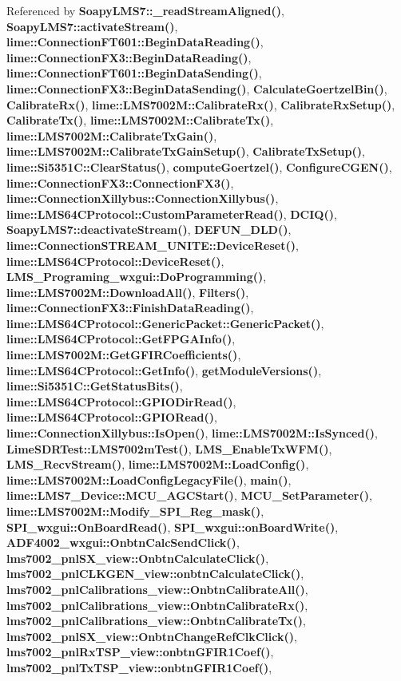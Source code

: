 Referenced by {\bf Soapy\+L\+M\+S7\+::\+\_\+read\+Stream\+Aligned()}, {\bf Soapy\+L\+M\+S7\+::activate\+Stream()}, {\bf lime\+::\+Connection\+F\+T601\+::\+Begin\+Data\+Reading()}, {\bf lime\+::\+Connection\+F\+X3\+::\+Begin\+Data\+Reading()}, {\bf lime\+::\+Connection\+F\+T601\+::\+Begin\+Data\+Sending()}, {\bf lime\+::\+Connection\+F\+X3\+::\+Begin\+Data\+Sending()}, {\bf Calculate\+Goertzel\+Bin()}, {\bf Calibrate\+Rx()}, {\bf lime\+::\+L\+M\+S7002\+M\+::\+Calibrate\+Rx()}, {\bf Calibrate\+Rx\+Setup()}, {\bf Calibrate\+Tx()}, {\bf lime\+::\+L\+M\+S7002\+M\+::\+Calibrate\+Tx()}, {\bf lime\+::\+L\+M\+S7002\+M\+::\+Calibrate\+Tx\+Gain()}, {\bf lime\+::\+L\+M\+S7002\+M\+::\+Calibrate\+Tx\+Gain\+Setup()}, {\bf Calibrate\+Tx\+Setup()}, {\bf lime\+::\+Si5351\+C\+::\+Clear\+Status()}, {\bf compute\+Goertzel()}, {\bf Configure\+C\+G\+E\+N()}, {\bf lime\+::\+Connection\+F\+X3\+::\+Connection\+F\+X3()}, {\bf lime\+::\+Connection\+Xillybus\+::\+Connection\+Xillybus()}, {\bf lime\+::\+L\+M\+S64\+C\+Protocol\+::\+Custom\+Parameter\+Read()}, {\bf D\+C\+I\+Q()}, {\bf Soapy\+L\+M\+S7\+::deactivate\+Stream()}, {\bf D\+E\+F\+U\+N\+\_\+\+D\+L\+D()}, {\bf lime\+::\+Connection\+S\+T\+R\+E\+A\+M\+\_\+\+U\+N\+I\+T\+E\+::\+Device\+Reset()}, {\bf lime\+::\+L\+M\+S64\+C\+Protocol\+::\+Device\+Reset()}, {\bf L\+M\+S\+\_\+\+Programing\+\_\+wxgui\+::\+Do\+Programming()}, {\bf lime\+::\+L\+M\+S7002\+M\+::\+Download\+All()}, {\bf Filters()}, {\bf lime\+::\+Connection\+F\+X3\+::\+Finish\+Data\+Reading()}, {\bf lime\+::\+L\+M\+S64\+C\+Protocol\+::\+Generic\+Packet\+::\+Generic\+Packet()}, {\bf lime\+::\+L\+M\+S64\+C\+Protocol\+::\+Get\+F\+P\+G\+A\+Info()}, {\bf lime\+::\+L\+M\+S7002\+M\+::\+Get\+G\+F\+I\+R\+Coefficients()}, {\bf lime\+::\+L\+M\+S64\+C\+Protocol\+::\+Get\+Info()}, {\bf get\+Module\+Versions()}, {\bf lime\+::\+Si5351\+C\+::\+Get\+Status\+Bits()}, {\bf lime\+::\+L\+M\+S64\+C\+Protocol\+::\+G\+P\+I\+O\+Dir\+Read()}, {\bf lime\+::\+L\+M\+S64\+C\+Protocol\+::\+G\+P\+I\+O\+Read()}, {\bf lime\+::\+Connection\+Xillybus\+::\+Is\+Open()}, {\bf lime\+::\+L\+M\+S7002\+M\+::\+Is\+Synced()}, {\bf Lime\+S\+D\+R\+Test\+::\+L\+M\+S7002m\+Test()}, {\bf L\+M\+S\+\_\+\+Enable\+Tx\+W\+F\+M()}, {\bf L\+M\+S\+\_\+\+Recv\+Stream()}, {\bf lime\+::\+L\+M\+S7002\+M\+::\+Load\+Config()}, {\bf lime\+::\+L\+M\+S7002\+M\+::\+Load\+Config\+Legacy\+File()}, {\bf main()}, {\bf lime\+::\+L\+M\+S7\+\_\+\+Device\+::\+M\+C\+U\+\_\+\+A\+G\+C\+Start()}, {\bf M\+C\+U\+\_\+\+Set\+Parameter()}, {\bf lime\+::\+L\+M\+S7002\+M\+::\+Modify\+\_\+\+S\+P\+I\+\_\+\+Reg\+\_\+mask()}, {\bf S\+P\+I\+\_\+wxgui\+::\+On\+Board\+Read()}, {\bf S\+P\+I\+\_\+wxgui\+::on\+Board\+Write()}, {\bf A\+D\+F4002\+\_\+wxgui\+::\+Onbtn\+Calc\+Send\+Click()}, {\bf lms7002\+\_\+pnl\+S\+X\+\_\+view\+::\+Onbtn\+Calculate\+Click()}, {\bf lms7002\+\_\+pnl\+C\+L\+K\+G\+E\+N\+\_\+view\+::onbtn\+Calculate\+Click()}, {\bf lms7002\+\_\+pnl\+Calibrations\+\_\+view\+::\+Onbtn\+Calibrate\+All()}, {\bf lms7002\+\_\+pnl\+Calibrations\+\_\+view\+::\+Onbtn\+Calibrate\+Rx()}, {\bf lms7002\+\_\+pnl\+Calibrations\+\_\+view\+::\+Onbtn\+Calibrate\+Tx()}, {\bf lms7002\+\_\+pnl\+S\+X\+\_\+view\+::\+Onbtn\+Change\+Ref\+Clk\+Click()}, {\bf lms7002\+\_\+pnl\+Rx\+T\+S\+P\+\_\+view\+::onbtn\+G\+F\+I\+R1\+Coef()}, {\bf lms7002\+\_\+pnl\+Tx\+T\+S\+P\+\_\+view\+::onbtn\+G\+F\+I\+R1\+Coef()}, 
